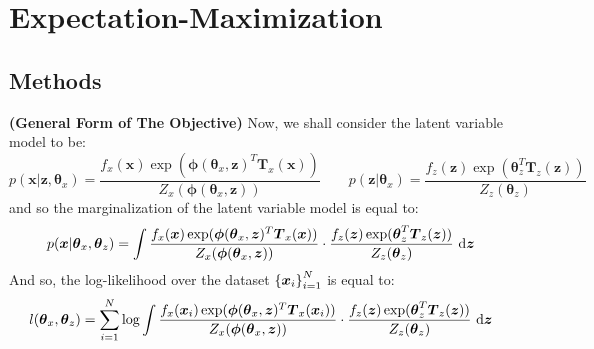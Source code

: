 \section{Expectation-Maximization}

\subsection{Methods}

\begin{remark}{\textbf{(General Form of The Objective)}} 
    Now, we shall consider the latent variable model to be:
    \begin{equation*}
        p(\boldsymbol x|\boldsymbol z, \boldsymbol \theta_x) = \frac{f_x(\boldsymbol x)\exp(\boldsymbol \phi(\boldsymbol \theta_x, \boldsymbol z)^T \boldsymbol T_x(\boldsymbol x) )}{Z_x(\boldsymbol \phi(\boldsymbol \theta_x, \boldsymbol z))} \qquad p(\boldsymbol z|\boldsymbol \theta_x) = \frac{f_z(\boldsymbol z)\exp(\boldsymbol \theta_z^T\boldsymbol T_z(\boldsymbol z))}{Z_z(\boldsymbol \theta_z)}
    \end{equation*}
    and so the marginalization of the latent variable model is equal to: 
    \begin{equation*}
        p(\boldsymbol x | \boldsymbol \theta_x, \boldsymbol \theta_z) = \int \frac{f_x(\boldsymbol x)\exp(\boldsymbol \phi(\boldsymbol \theta_x, \boldsymbol z)^T \boldsymbol T_x(\boldsymbol x) )}{Z_x(\boldsymbol \phi(\boldsymbol \theta_x, \boldsymbol z))} \cdot \frac{f_z(\boldsymbol z)\exp(\boldsymbol \theta_z^T\boldsymbol T_z(\boldsymbol z))}{Z_z(\boldsymbol \theta_z)}\ \mathrm{d} \boldsymbol z
    \end{equation*}
    And so, the log-likelihood over the dataset $\left\{ \boldsymbol x_i \right\}^N_{i=1}$ is equal to:
    \begin{equation*}
        l(\boldsymbol \theta_x, \boldsymbol \theta_z) = \sum^N_{i=1} \log \int \frac{f_x(\boldsymbol x_i)\exp(\boldsymbol \phi(\boldsymbol \theta_x, \boldsymbol z)^T \boldsymbol T_x(\boldsymbol x_i) )}{Z_x(\boldsymbol \phi(\boldsymbol \theta_x, \boldsymbol z))} \cdot \frac{f_z(\boldsymbol z)\exp(\boldsymbol \theta_z^T\boldsymbol T_z(\boldsymbol z))}{Z_z(\boldsymbol \theta_z)}\ \mathrm{d} \boldsymbol z
    \end{equation*}
\end{remark}

